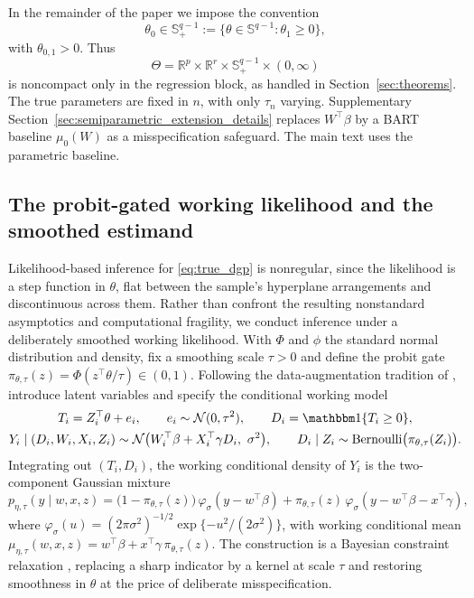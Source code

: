 \documentclass[11pt]{article}
\theoremstyle{definition}
\theoremstyle{plain}
\newcommand{\R}{\mathbb{R}}
\begin{document}
In the remainder of the paper we impose the convention
\begin{equation}
\theta_0\in\mathbb S^{q-1}_+:=\{\theta\in\mathbb S^{q-1}:\theta_1\ge0\},
\label{eq:hemisphere}
\end{equation}
with $\theta_{0,1}>0$. Thus 
\[
\Theta=\R^p\times\R^r\times\mathbb S^{q-1}_+\times(0,\infty)
\] 
is noncompact only in the regression block, as handled in Section~\ref{sec:theorems}. The true parameters are fixed in $n$, with only $\tau_n$ varying. Supplementary Section~\ref{sec:semiparametric_extension_details} replaces $W^\top\beta$ by a BART baseline $\mu_0(W)$ \citep{Chipman2010} as a misspecification safeguard. The main text uses the parametric baseline.

\subsection{The probit-gated working likelihood and the smoothed estimand}\label{sec:working_likelihood}

Likelihood-based inference for \eqref{eq:true_dgp} is nonregular, since the likelihood is a step function in $\theta$, flat between the sample's hyperplane arrangements and discontinuous across them. Rather than confront the resulting nonstandard asymptotics \citep{ChernozhukovHong2004,Yu2012} and computational fragility, we conduct inference under a deliberately smoothed working likelihood. With $\Phi$ and $\phi$ the standard normal distribution and density, fix a smoothing scale $\tau>0$ and define the probit gate $\pi_{\theta,\tau}(z)=\Phi(z^\top\theta/\tau)\in(0,1)$.
Following the data-augmentation tradition of \citet{Albert1993}, introduce latent variables and specify the conditional working model
\begin{gather}
T_i= Z_i^\top\theta+e_i,\qquad e_i\sim\mathcal N(0,\tau^2),\qquad D_i=\mathbbm 1\{T_i\ge0\},
\label{eq:augmentation}\\
Y_i \mid (D_i,W_i,X_i,Z_i) \sim \mathcal N\big(W_i^\top\beta+X_i^\top\gamma D_i,\ \sigma^2\big), \qquad
D_i \mid Z_i \sim \mathrm{Bernoulli}\big(\pi_{\theta,\tau}(Z_i)\big).
\label{eq:working_model}
\end{gather}
Integrating out $(T_i,D_i)$, the working conditional density of $Y_i$ is the two-component Gaussian mixture
\begin{equation}
p_{\eta,\tau}(y\mid w,x,z)
=\big(1-\pi_{\theta,\tau}(z)\big)\,\varphi_{\sigma}(y-w^\top\beta)
+\pi_{\theta,\tau}(z)\,\varphi_{\sigma}(y-w^\top\beta-x^\top\gamma),
\label{eq:working_mix}
\end{equation}
where $\varphi_\sigma(u)=(2\pi\sigma^2)^{-1/2}\exp\{-u^2/(2\sigma^2)\}$, with working conditional mean
$\mu_{\eta,\tau}(w,x,z)=w^\top\beta+x^\top\gamma\,\pi_{\theta,\tau}(z)$. The construction is a Bayesian constraint relaxation \citep{Duan2019}, replacing a sharp indicator by a kernel at scale $\tau$ and restoring smoothness in $\theta$ at the price of deliberate misspecification.
\end{document}
